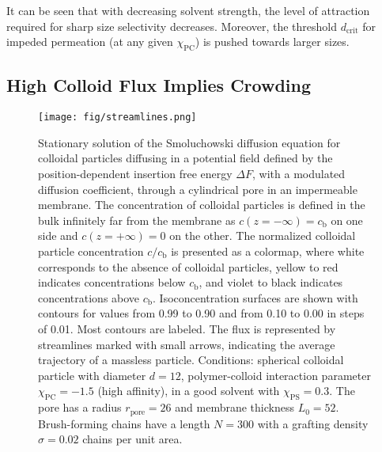 \documentclass[12pt, a4paper]{article}
\begin{document}
It can be seen that with decreasing solvent strength, the level of attraction required for sharp size selectivity decreases. 
Moreover, the threshold $d_{\text{crit}}$ for impeded permeation (at any given $\chi_{\text{PC}}$) is pushed towards larger sizes.


\subsection{High Colloid Flux Implies Crowding}

\begin{figure}
    \centering
    \texttt{[image: fig/streamlines.png]}
    \caption{
    Stationary solution of the Smoluchowski diffusion equation for colloidal particles diffusing in a potential field defined by the position-dependent insertion free energy $\Delta F$, with a modulated diffusion coefficient, through a cylindrical pore in an impermeable membrane.
    The concentration of colloidal particles is defined in the bulk infinitely far from the membrane as $c(z = -\infty) = c_{\text{b}}$ on one side and $c(z = +\infty) = 0$ on the other.
    The normalized colloidal particle concentration $c / c_{\text{b}}$ is presented as a colormap, where white corresponds to the absence of colloidal particles, yellow to red indicates concentrations below $c_{\text{b}}$, and violet to black indicates concentrations above $c_{\text{b}}$.
    Isoconcentration surfaces are shown with contours for values from 0.99 to 0.90 and from 0.10 to 0.00 in steps of 0.01.
    Most contours are labeled.
    The flux is represented by streamlines marked with small arrows, indicating the average trajectory of a massless particle.
    Conditions: spherical colloidal particle with diameter $d = 12$, polymer-colloid interaction parameter $\chi_{\text{PC}} = -1.5$ (high affinity), in a good solvent with $\chi_{\text{PS}} = 0.3$.
    The pore has a radius $r_{\text{pore}} = 26$ and membrane thickness $L_{0} = 52$.
    Brush-forming chains have a length $N = 300$ with a grafting density $\sigma = 0.02$ chains per unit area.
    }
    \label{fig:colloid_concentration}
\end{figure}
\end{document}
